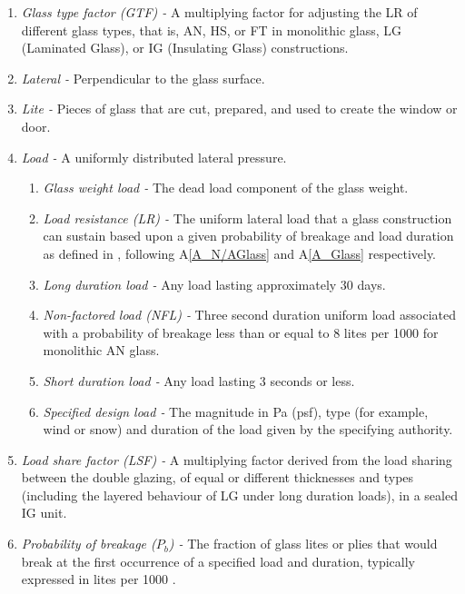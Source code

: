 \documentclass[12pt]{article}
\newcommand{\aref}[1]{A\ref{#1}}
\begin{document}
\begin{enumerate}
\begin{enumerate}
\end{enumerate}
  
\item \textit{Glass type factor (GTF) -} A multiplying factor for adjusting the 
LR of different glass types, that is, AN, HS, or FT in monolithic glass, LG
(Laminated Glass), or IG (Insulating Glass) constructions.

\item \textit{Lateral -} Perpendicular to the glass surface.

\item \textit{Lite -} Pieces of glass that are cut, prepared, and used to create the window or door.

\item \textit{Load -} A uniformly distributed lateral pressure.

\begin{enumerate}
\item \textit{Glass weight load -} The dead load component of the glass weight. 
\item \textit{Load resistance (LR) -} The uniform lateral load that a glass 
construction can sustain based upon a given probability of breakage and load 
duration as defined in \cite[(pg. 1, 53)]{ASTM2009}, following \aref{A_N/AGlass} and \aref{A_Glass} respectively.
\item \textit{Long duration load -} Any load lasting approximately 30 days. 
\item \textit{Non-factored load (NFL) -} Three second duration uniform load 
associated with a probability of breakage less than or equal to 8 lites per 1000 
for monolithic AN glass.
\item \textit{Short duration load -} Any load lasting 3 seconds or less.
\item \textit{Specified design load -} The magnitude in Pa (psf), type (for 
example, wind or snow) and duration of the load given by the specifying authority.


\end{enumerate}

\item \textit{Load share factor (LSF) -} A multiplying factor derived from the 
load sharing between the double glazing, of equal or different thicknesses and 
types (including the layered behaviour of LG under long duration loads), in a 
sealed IG unit.

\item \textit{Probability of breakage ($P_b$) -} The fraction of glass lites or 
plies that would break at the first occurrence of a specified load and duration, 
typically expressed in lites per 1000 \cite{ASTM2016}.


\end{enumerate}
\end{document}

